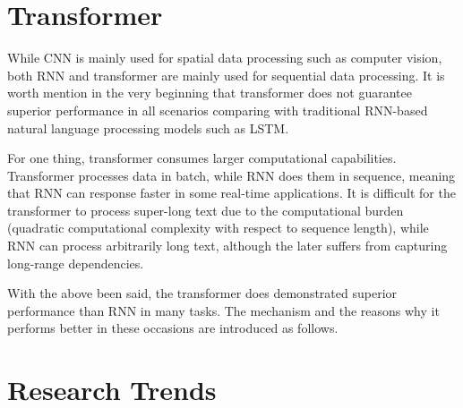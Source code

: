 \section{Transformer}

While CNN is mainly used for spatial data processing such as computer vision, both RNN and transformer are mainly used for sequential data processing. It is worth mention in the very beginning that transformer does not guarantee superior performance in all scenarios comparing with traditional RNN-based natural language processing models such as LSTM.

For one thing, transformer consumes larger computational capabilities. Transformer processes data in batch, while RNN does them in sequence, meaning that RNN can response faster in some real-time applications. It is difficult for the transformer to process super-long text due to the computational burden (quadratic computational complexity with respect to sequence length), while RNN can process arbitrarily long text, although the later suffers from capturing long-range dependencies.

With the above been said, the transformer does demonstrated superior performance than RNN in many tasks. The mechanism and the reasons why it performs better in these occasions are introduced as follows.

\section{Research Trends} 